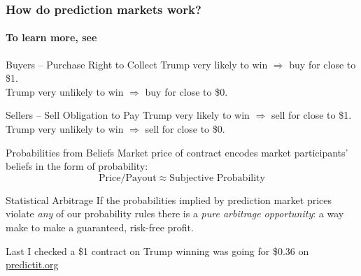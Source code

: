\documentclass{beamer}
\begin{document}
\begin{frame}

\frametitle{How do prediction markets work?}
\framesubtitle{To learn more, see }
\begin{center}
\vspace{1em}

\begin{block}{Buyers -- Purchase Right to Collect}
Trump very likely to win $\Rightarrow$ buy for close to \$1. \\Trump very unlikely to win $\Rightarrow$ buy for close to \$0.
\end{block}

\begin{block}{Sellers -- Sell Obligation to Pay} 
Trump very likely to win $\Rightarrow$ sell for close to \$1. \\Trump very unlikely to win $\Rightarrow$ sell for close to \$0.
\end{block}
\end{center}

\end{frame}
\begin{frame}

  \begin{block}{Probabilities from Beliefs}
    Market price of contract encodes market participants' beliefs in the form of probability:
$$\mbox{Price}/\mbox{Payout}\approx \mbox{Subjective Probability}$$
  \end{block} \pause

	\begin{alertblock}{Statistical Arbitrage}
    If the probabilities implied by prediction market prices violate \emph{any} of our probability rules there is a \emph{pure arbitrage opportunity}: a way make to make a guaranteed, risk-free profit.
	\end{alertblock} \pause

  \vspace{1em}
  \alert{Last I checked a \$1 contract on Trump winning was going for \$0.36 on \url{predictit.org}}
\end{frame}
\end{document}
